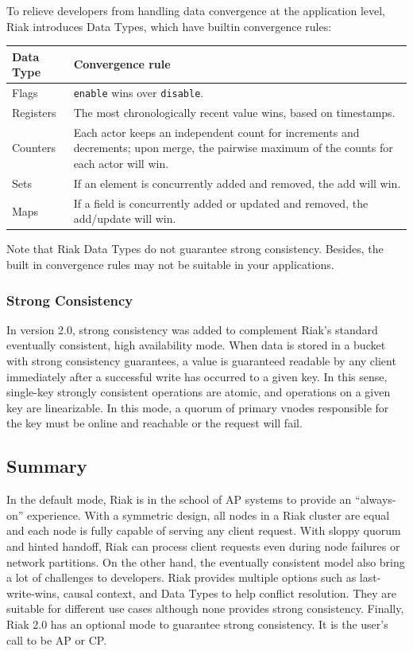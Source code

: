 \documentclass[12pt]{book}
\begin{document}
To relieve developers from handling data convergence at the application level, Riak introduces Data Types, which have builtin convergence rules: 

\begin{center}
\begin{tabular}{ l p{3in} }
\hline
\textbf{Data Type} & \textbf{Convergence rule} \\
\hline
Flags	& \texttt{enable} wins over \texttt{disable}. \\
Registers	& The most chronologically recent value wins, based on timestamps. \\
Counters	& Each actor keeps an independent count for increments and decrements; upon merge, the pairwise maximum of the counts for each actor will win. \\
Sets	        & If an element is concurrently added and removed, the add will win. \\
Maps       & If a field is concurrently added or updated and removed, the add/update will win. \\
\hline
\end{tabular}
\end{center}

Note that Riak Data Types do not guarantee strong consistency. Besides, the built in convergence rules may not be suitable in your applications. 

\subsubsection{Strong Consistency}
In version 2.0, strong consistency was added to complement Riak's standard eventually consistent, high availability mode. When data is stored in a bucket with strong consistency guarantees, a value is guaranteed readable by any client immediately after a successful write has occurred to a given key. In this sense, single-key strongly consistent operations are atomic, and operations on a given key are linearizable. In this mode, a quorum of primary vnodes responsible for the key must be online and reachable or the request will fail.

\subsection{Summary}
In the default mode, Riak is in the school of AP systems to provide an ``always-on'' experience. With a symmetric design, all nodes in a Riak cluster are equal and each node is fully capable of serving any client request. With sloppy quorum and hinted handoff, Riak can process client requests even during node failures or network partitions. On the other hand, the eventually consistent model also bring a lot of challenges to developers. Riak provides multiple options such as last-write-wins, causal context, and Data Types to help conflict resolution. They are suitable for different use cases although none provides strong consistency. Finally, Riak 2.0 has an optional mode to guarantee strong consistency. It is the user's call to be AP or CP.
\end{document}
